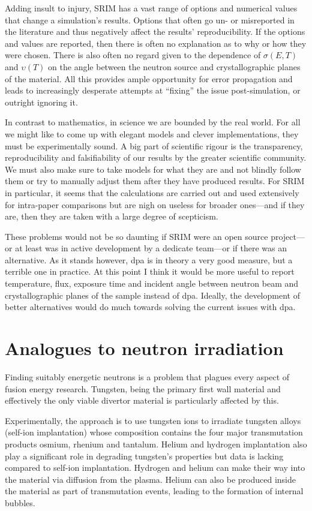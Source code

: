 \documentclass[12pt, a4paper]{article}
\newcommand{\da}{dpa}
\newcommand{\fs}{fusion}
\newcommand{\en}{energy}
\newcommand{\n}{neutron}
\newcommand{\ir}{irradiation}
\newcommand{\tr}{transmutation}
\begin{document}
		Adding insult to injury, SRIM has a vast range of options and numerical values that change a simulation's results. Options that often go un- or misreported in the literature and thus negatively affect the results' reproducibility. If the options and values are reported, then there is often no explanation as to why or how they were chosen. There is also often no regard given to the dependence of $\sigma (E,T)$ and $\upsilon (T)$ on the angle between the \n{} source and crystallographic planes of the material. All this provides ample opportunity for error propagation and leads to increasingly desperate attempts at ``fixing'' the issue post-simulation, or outright ignoring it.
		
		In contrast to mathematics, in science we are bounded by the real world. For all we might like to come up with elegant models and clever implementations, they must be experimentally sound. A big part of scientific rigour is the transparency, reproducibility and falsifiability of our results by the greater scientific community. We must also make sure to take models for what they are and not blindly follow them or try to manually adjust them after they have produced results. For SRIM in particular, it seems that the calculations are carried out and used extensively for intra-paper comparisons but are nigh on useless for broader ones---and if they are, then they are taken with a large degree of scepticism.
		
		These problems would not be so daunting if SRIM were an open source project---or at least was in active development by a dedicate team---or if there was an alternative. As it stands however, \da{} is in theory a very good measure, but a terrible one in practice. At this point I think it would be more useful to report temperature, flux, exposure time and incident angle between \n{} beam and crystallographic planes of the sample instead of \da{}. Ideally, the development of better alternatives would do much towards solving the current issues with \da{}.
		
		\section{Analogues to \n{} \ir{}}\label{s:ni}
		Finding suitably energetic \n{s} is a problem that plagues every aspect of \fs{} \en{} research. Tungsten, being the primary first wall material and effectively the only viable divertor material is particularly affected by this. 
		
		Experimentally, the approach is to use tungsten ions to irradiate tungsten alloys (self-ion implantation) whose composition contains the four major \tr{} products osmium, rhenium and tantalum. Helium and hydrogen implantation also play a significant role in degrading tungsten's properties but data is lacking compared to self-ion implantation. Hydrogen and helium can make their way into the material via diffusion from the plasma. Helium can also be produced inside the material as part of \tr{} events, leading to the formation of internal bubbles. 
		
\end{document}
